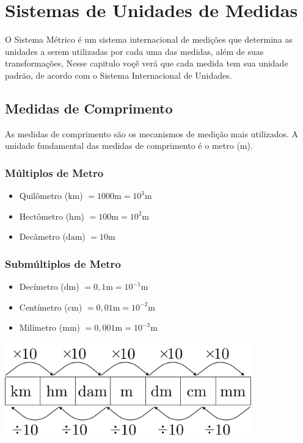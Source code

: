\chapter{Sistemas de Unidades de Medidas}
O Sistema Métrico é um sistema internacional de medições que determina as unidades a serem utilizadas por cada uma das medidas, além de suas transformações, Nesse capitulo voçê verá que cada medida tem sua unidade padrão, de acordo com o Sistema Internacional de Unidades.

\section{Medidas de Comprimento}
As medidas de comprimento são os mecanismos de medição mais utilizados. A unidade fundamental das medidas de comprimento é o metro ($\mathrm{m}$). 
\begin{multicols}{2}
	\subsection{Múltiplos de Metro}
		\begin{itemize}
			\item Quilômetro ($\mathrm{km}$) $= 1000 \mathrm{m} = 10^3 \mathrm{m}$
			\item Hectômetro ($\mathrm{hm}$) $= 100 \mathrm{m} = 10^2\mathrm{m}$
			\item Decâmetro ($\mathrm{dam}$) $= 10 \mathrm{m}$ 
			
		\end{itemize}

	\subsection{Submúltiplos de Metro}
		\begin{itemize}
			\item Dec\'imetro ($\mathrm{dm}$) $= 0,1\mathrm{m} = 10^{-1}\mathrm{m}$
			\item Centímetro ($\mathrm{cm}$) $= 0,01\mathrm{m} = 10^{-2}\mathrm{m}$
			\item Milímetro ($\mathrm{mm}$) $= 0,001\mathrm{m} = 10^{-3}\mathrm{m}$
		\end{itemize}
\columnbreak
     \bigskip
     \noindent   %
     \begin{minipage}{\linewidth}
            \centering 
            \includegraphics[width=0.8\textwidth]{imagens/matematicaBasica/sistemaDeUnidades/MultiplosDeMetro.pdf}
     \end{minipage}
   \end{multicols}


